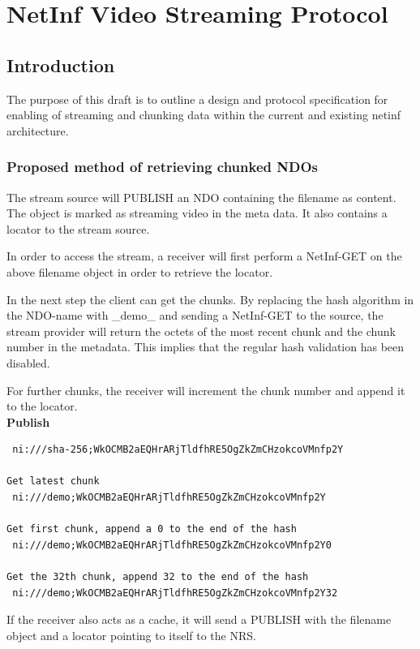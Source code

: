 \section {NetInf Video Streaming Protocol}\label{VideoDraft}

\subsection{Introduction}

The purpose of this draft is to outline a design and protocol specification for enabling of streaming and chunking data within the current and existing netinf architecture.

\subsubsection{Proposed method of retrieving chunked NDOs}

The stream source will PUBLISH an NDO containing the filename as content. The object is marked as streaming video in the meta data. It also contains a locator to the stream source.

In order to access the stream, a receiver will first perform a NetInf-GET on the above filename object in order to retrieve the locator. 

In the next step the client can get the chunks. By replacing the hash algorithm in the NDO-name with \_demo\_ and sending a NetInf-GET to the source, the stream provider will return the octets of the most recent chunk and the chunk number in the metadata. This implies that the regular hash validation has been disabled.

For further chunks, the receiver will increment the chunk number and append it to the locator.\\

\textbf{Publish}\\
\begin{verbatim}
 ni:///sha-256;WkOCMB2aEQHrARjTldfhRE5OgZkZmCHzokcoVMnfp2Y

Get latest chunk
 ni:///demo;WkOCMB2aEQHrARjTldfhRE5OgZkZmCHzokcoVMnfp2Y

Get first chunk, append a 0 to the end of the hash
 ni:///demo;WkOCMB2aEQHrARjTldfhRE5OgZkZmCHzokcoVMnfp2Y0

Get the 32th chunk, append 32 to the end of the hash
 ni:///demo;WkOCMB2aEQHrARjTldfhRE5OgZkZmCHzokcoVMnfp2Y32
\end{verbatim}
 
If the receiver also acts as a cache, it will send a PUBLISH with the filename object and a locator pointing to itself to the NRS.
\\

